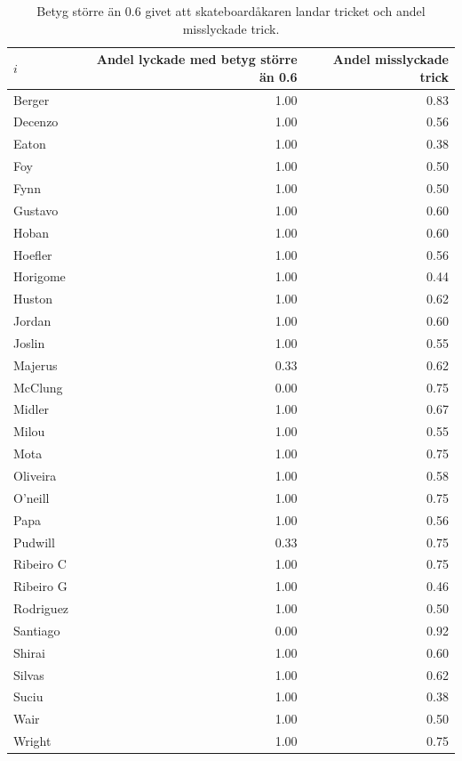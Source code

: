 \documentclass{article}
\begin{document}
\begin{table}[H]
    \centering
    \begin{tabular}{lrr}
      \toprule
      $i$ & \textbf{Andel lyckade med betyg större än 0.6} & \textbf{Andel misslyckade trick} \\
      \midrule
      Berger    & 1.00 & 0.83 \\
      Decenzo   & 1.00 & 0.56 \\
      Eaton     & 1.00 & 0.38 \\
      Foy       & 1.00 & 0.50 \\
      Fynn      & 1.00 & 0.50 \\
      Gustavo   & 1.00 & 0.60 \\
      Hoban     & 1.00 & 0.60 \\
      Hoefler   & 1.00 & 0.56 \\
      Horigome  & 1.00 & 0.44 \\
      Huston    & 1.00 & 0.62 \\
      Jordan    & 1.00 & 0.60 \\
      Joslin    & 1.00 & 0.55 \\
      Majerus   & 0.33 & 0.62 \\
      McClung   & 0.00 & 0.75 \\
      Midler    & 1.00 & 0.67 \\
      Milou     & 1.00 & 0.55 \\
      Mota      & 1.00 & 0.75 \\
      Oliveira  & 1.00 & 0.58 \\
      O’neill   & 1.00 & 0.75 \\
      Papa      & 1.00 & 0.56 \\
      Pudwill   & 0.33 & 0.75 \\
      Ribeiro C & 1.00 & 0.75 \\
      Ribeiro G & 1.00 & 0.46 \\
      Rodriguez & 1.00 & 0.50 \\
      Santiago  & 0.00 & 0.92 \\
      Shirai    & 1.00 & 0.60 \\
      Silvas    & 1.00 & 0.62 \\
      Suciu     & 1.00 & 0.38 \\
      Wair      & 1.00 & 0.50 \\
      Wright    & 1.00 & 0.75 \\
      \bottomrule
    \end{tabular}
    \caption{Betyg större än 0.6 givet att skateboardåkaren landar tricket och andel misslyckade trick.}
    \label{tab:1d}
\end{table}
\newpage
\end{document}
